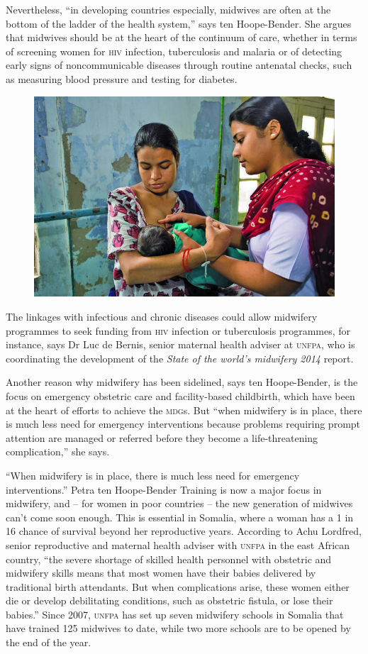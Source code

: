 \documentclass{article}
\begin{document}
Nevertheless, “in developing countries especially, midwives are often at the
bottom of the
ladder of the health system,” says ten Hoope-Bender. She argues that midwives
should be at
the heart of the continuum of care, whether in terms of screening women for \textsc{hiv}
infection,
tuberculosis and malaria or of detecting early signs of noncommunicable diseases
through routine
antenatal checks, such as measuring blood pressure and testing for diabetes.
\begin{figure}
\includegraphics[width=\textwidth]{0042-9686-bwho-91-11-804-Fb}
\caption{}\label{fig:Fb}
\end{figure}

The linkages with infectious and chronic diseases could allow midwifery
programmes to seek
funding from \textsc{hiv} infection or tuberculosis programmes, for instance, says Dr Luc
de Bernis, senior
maternal health adviser at \textsc{unfpa}, who is coordinating the development of the
\textit{State of the
world's midwifery 2014}
report.

Another reason why midwifery has been sidelined, says ten Hoope-Bender, is the
focus on emergency
obstetric care and facility-based childbirth, which have been at the heart of
efforts to achieve the
\textsc{mdg}s. But “when midwifery is in place, there is much less need for emergency
interventions
because problems requiring prompt attention are managed or referred before they
become a
life-threatening complication,” she says.

“When midwifery is in place, there is much less need for emergency
interventions.”
Petra ten Hoope-Bender
Training is now a major focus in midwifery, and – for women in poor countries –
the
new generation of midwives can't come soon enough. This is essential in Somalia,
where a
woman has a 1 in 16 chance of survival beyond her reproductive years. According
to Achu Lordfred,
senior reproductive and maternal health adviser with \textsc{unfpa} in the east African
country, “the
severe shortage of skilled health personnel with obstetric and midwifery skills
means that most
women have their babies delivered by traditional birth attendants. But when
complications arise,
these women either die or develop debilitating conditions, such as obstetric
fistula, or lose their
babies.” Since 2007, \textsc{unfpa} has set up seven midwifery schools in Somalia that
have trained
125 midwives to date, while two more schools are to be opened by the end of the
year.
\end{document}
